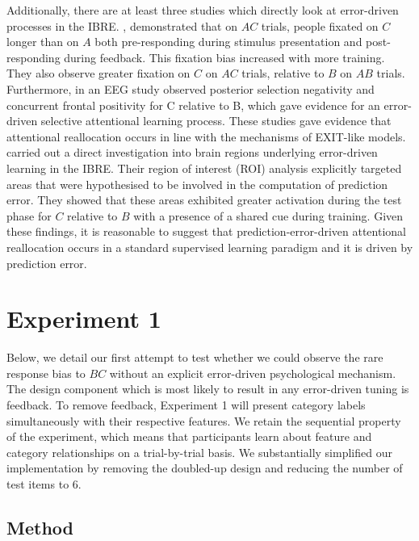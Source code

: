 \documentclass[10pt,letterpaper]{article}
\begin{document}
Additionally, there are at least three studies which directly look at error-driven processes in the IBRE.
, demonstrated that on $AC$ trials, people fixated on $C$ longer than on $A$ both pre-responding during stimulus presentation and post-responding during feedback.
This fixation bias increased with more training.
They also observe greater fixation on $C$ on $AC$ trials, relative to $B$ on $AB$ trials.
Furthermore,  in an EEG study observed posterior selection negativity and concurrent frontal positivity for C relative to B, which gave evidence for an error-driven selective attentional learning process.
These studies gave evidence that attentional reallocation occurs in line with the mechanisms of EXIT-like models.
 carried out a direct investigation into brain regions underlying error-driven learning in the IBRE.
Their region of interest (ROI) analysis explicitly targeted areas that were hypothesised to be involved in the computation of prediction error.
They showed that these areas exhibited greater activation during the test phase for $C$ relative to $B$ with a presence of a shared cue during training.
Given these findings, it is reasonable to suggest that prediction-error-driven attentional reallocation occurs in a standard supervised learning paradigm and it is driven by prediction error.

\section{Experiment 1}

Below, we detail our first attempt to test whether we could observe the rare response bias to $BC$ without an explicit error-driven psychological mechanism.
The design component which is most likely to result in any error-driven tuning is feedback.
To remove feedback, Experiment 1 will present category labels simultaneously with their respective features.
We retain the sequential property of the experiment, which means that participants learn about feature and category relationships on a trial-by-trial basis.
We substantially simplified our implementation by removing the doubled-up design and reducing the number of test items to 6.

\subsection{Method}
\end{document}
